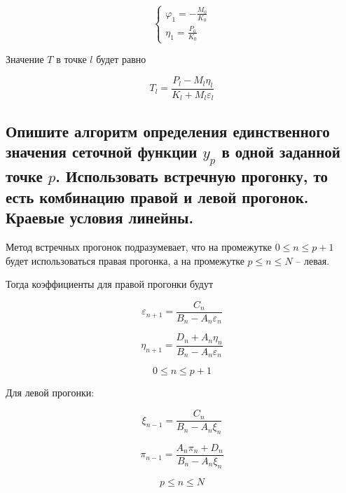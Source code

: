 \begin{equation*}
    \begin{cases}
        \varphi_1 = -\frac{M_0}{K_0} \\
        \eta_1 = \frac{P_0}{K_0}
    \end{cases}
\end{equation*}

Значение $T$ в точке $l$ будет равно

\begin{equation*}
    T_l = \frac{P_l - M_l \eta_l}{K_l + M_l \varepsilon_l}
\end{equation*}

\subsection{Опишите алгоритм определения единственного значения сеточной функции $y_p$ в одной заданной точке $p$. Использовать встречную прогонку, то есть комбинацию правой и левой прогонок. Краевые условия линейны.}

Метод встречных прогонок подразумевает, что на промежутке $0 \le n \le p + 1$ будет использоваться правая прогонка, а на промежутке $p \le n \le N$ -- левая.

Тогда коэффициенты для правой прогонки будут

\begin{equation*}
    \varepsilon_{n+1} = \frac{C_n}{B_n-A_n\varepsilon_n}
\end{equation*}

\begin{equation*}
    \eta_{n+1} = \frac{D_n + A_n \eta_n}{B_n - A_n \varepsilon_n}
\end{equation*}

\begin{equation*}
    0 \le n \le p+1
\end{equation*}

Для левой прогонки:

\begin{equation*}
    \xi_{n-1} = \frac{C_n}{B_n - A_n \xi_n}
\end{equation*}

\begin{equation*}
    \pi_{n-1} = \frac{A_n\pi_n + D_n}{B_n - A_n\xi_n}
\end{equation*}

\begin{equation*}
    p \le n \le N
\end{equation*}


